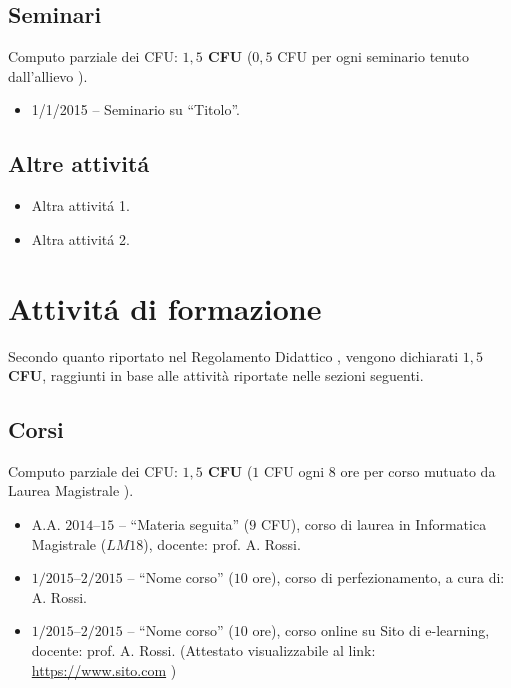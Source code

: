 \documentclass[a4paper,12pt]{article}
\begin{document}
\subsection{Seminari}
Computo parziale dei CFU: \textbf{$1,5$ CFU} ($0,5$ CFU per ogni seminario tenuto dall'allievo \cite{regolamento}).
\begin{itemize}
    \item 1/1/2015 -- Seminario su ``Titolo''.
\end{itemize}

\subsection{Altre attivit\'{a}}
\begin{itemize}
    \item Altra attivit\'{a} 1.
    \item Altra attivit\'{a} 2.
\end{itemize}


\section{Attivit\'{a} di formazione}
Secondo quanto riportato nel Regolamento Didattico \cite{regolamento}, vengono dichiarati \textbf{$1,5$ CFU}, raggiunti in base alle attività riportate nelle sezioni seguenti.

\subsection{Corsi}
Computo parziale dei CFU: \textbf{$1,5$ CFU} ($1$ CFU ogni $8$ ore per corso mutuato da Laurea Magistrale \cite{regolamento}).
\begin{itemize}
    \item A.A. $2014$--$15$ -- ``Materia seguita'' ($9$ CFU), corso di laurea in Informatica Magistrale ($LM18$), docente: prof. A. Rossi.
    \item $1/2015$--$2/2015$ -- ``Nome corso'' ($10$ ore), corso di perfezionamento, a cura di: A. Rossi.
    \item $1/2015$--$2/2015$ -- ``Nome corso'' ($10$ ore), corso online su Sito di e-learning, docente: prof. A. Rossi. (Attestato visualizzabile al link: \url{https://www.sito.com} )
\end{itemize}
\end{document}

